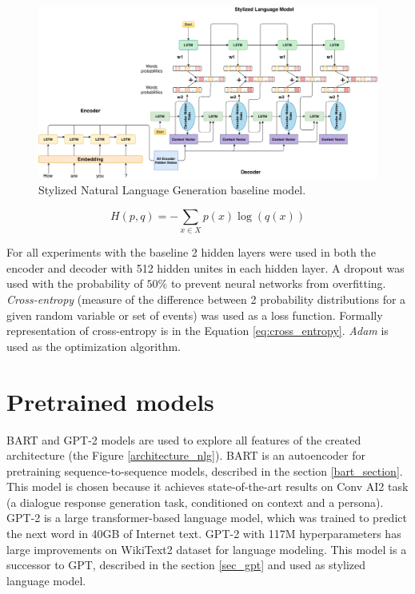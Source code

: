 \begin{figure}[hbt]
  \centering
  \includegraphics[width=1\textwidth]{figures/combine_models.pdf}
  \caption{Stylized Natural Language Generation baseline model.}
  \label{implementation_architecture}
\end{figure}

\begin{eqfloat}
\begin{equation} \label{eq:cross_entropy}
H(p,q) = -\sum_{x \in X} p(x)\log(q(x))
\end{equation}
\caption{$p$ is the target distribution, $q$ is the approximation of the target distribution. $p(x)$ is the probability of the event $x$ in $p$, $q(x)$ is the probability of the event $x$ in $q$.}
\end{eqfloat}

For all experiments with the baseline 2 hidden layers were used in both the encoder and decoder with 512 hidden unites in each hidden layer. A dropout \cite{srivastava2014dropout} was used with the probability of $50\%$ to prevent neural networks from overfitting. \textit{Cross-entropy} (measure of the difference between 2 probability distributions for a given random variable or set of events) was used as a loss function. Formally representation of cross-entropy is in the Equation \ref{eq:cross_entropy}. \textit{Adam} \cite{kingma2014adam} is used as the optimization algorithm.

\section{Pretrained models}
BART and GPT-2 models are used to explore all features of the created architecture (the Figure \ref{architecture_nlg}). BART is an autoencoder for pretraining sequence-to-sequence models, described in the section \ref{bart_section}. This model is chosen because it achieves state-of-the-art results on Conv AI2 task (a dialogue response generation task, conditioned on context and a persona). GPT-2 is a large transformer-based language model, which was trained to predict the next word in 40GB of Internet text. GPT-2 with 117M hyperparameters has large improvements on WikiText2 dataset for language modeling. This model is a successor to GPT, described in the section \ref{sec_gpt} and used as stylized language model. 

